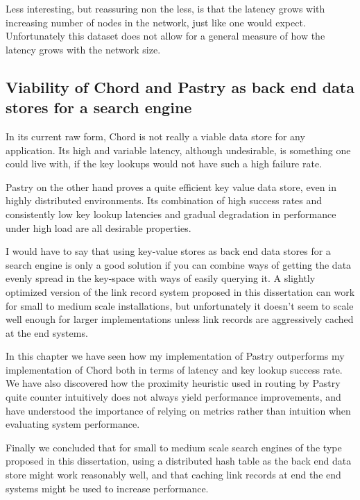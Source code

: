 Less interesting, but reassuring non the less, is that the latency grows with increasing number of nodes in the network, just like one would expect. Unfortunately this dataset does not allow for a general measure of how the latency grows with the network size.

\subsection{Viability of Chord and Pastry as back end data stores for a search engine}
In its current raw form, Chord is not really a viable data store for any application. Its high and variable latency, although undesirable, is something one could live with, if the key lookups would not have such a high failure rate.

Pastry on the other hand proves a quite efficient key value data store, even in highly distributed environments. Its combination of high success rates and consistently low key lookup latencies and gradual degradation in performance under high load are all desirable properties.

I would have to say that using key-value stores as back end data stores for a search engine is only a good solution if you can combine ways of getting the data evenly spread in the key-space with ways of easily querying it.
A slightly optimized version of the link record system proposed in this dissertation can work for small to medium scale installations, but unfortunately it doesn't seem to scale well enough for larger implementations unless link records are aggressively cached at the end systems.

\mbox{}

In this chapter we have seen how my implementation of Pastry outperforms my implementation of Chord both in terms of latency and key lookup success rate.
We have also discovered how the proximity heuristic used in routing by Pastry quite counter intuitively does not always yield performance improvements, and have understood the importance of relying on metrics rather than intuition when evaluating system performance.

Finally we concluded that for small to medium scale search engines of the type proposed in this dissertation, using a distributed hash table as the back end data store might work reasonably well, and that caching link records at end the end systems might be used to increase performance.
